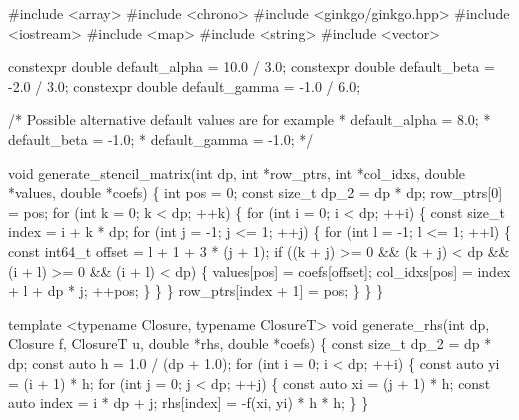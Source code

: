 {\begin{DoxyCodeInclude}
\textcolor{preprocessor}{#include <array>}
\textcolor{preprocessor}{#include <chrono>}
\textcolor{preprocessor}{#include <ginkgo/ginkgo.hpp>}
\textcolor{preprocessor}{#include <iostream>}
\textcolor{preprocessor}{#include <map>}
\textcolor{preprocessor}{#include <string>}
\textcolor{preprocessor}{#include <vector>}

constexpr \textcolor{keywordtype}{double} default\_alpha = 10.0 / 3.0;
constexpr \textcolor{keywordtype}{double} default\_beta = -2.0 / 3.0;
constexpr \textcolor{keywordtype}{double} default\_gamma = -1.0 / 6.0;

\textcolor{comment}{/* Possible alternative default values are for example}
\textcolor{comment}{ * default\_alpha = 8.0;}
\textcolor{comment}{ * default\_beta = -1.0;}
\textcolor{comment}{ * default\_gamma = -1.0;}
\textcolor{comment}{ */}

\textcolor{keywordtype}{void} generate\_stencil\_matrix(\textcolor{keywordtype}{int} dp, \textcolor{keywordtype}{int} *row\_ptrs, \textcolor{keywordtype}{int} *col\_idxs,
                             \textcolor{keywordtype}{double} *values, \textcolor{keywordtype}{double} *coefs)
\{
    \textcolor{keywordtype}{int} pos = 0;
    \textcolor{keyword}{const} \textcolor{keywordtype}{size\_t} dp\_2 = dp * dp;
    row\_ptrs[0] = pos;
    \textcolor{keywordflow}{for} (\textcolor{keywordtype}{int} k = 0; k < dp; ++k) \{
        \textcolor{keywordflow}{for} (\textcolor{keywordtype}{int} i = 0; i < dp; ++i) \{
            \textcolor{keyword}{const} \textcolor{keywordtype}{size\_t} index = i + k * dp;
            \textcolor{keywordflow}{for} (\textcolor{keywordtype}{int} j = -1; j <= 1; ++j) \{
                \textcolor{keywordflow}{for} (\textcolor{keywordtype}{int} l = -1; l <= 1; ++l) \{
                    \textcolor{keyword}{const} int64\_t offset = l + 1 + 3 * (j + 1);
                    \textcolor{keywordflow}{if} ((k + j) >= 0 && (k + j) < dp && (i + l) >= 0 &&
                        (i + l) < dp) \{
                        values[pos] = coefs[offset];
                        col\_idxs[pos] = index + l + dp * j;
                        ++pos;
                    \}
                \}
            \}
            row\_ptrs[index + 1] = pos;
        \}
    \}
\}


\textcolor{keyword}{template} <\textcolor{keyword}{typename} Closure, \textcolor{keyword}{typename} ClosureT>
\textcolor{keywordtype}{void} generate\_rhs(\textcolor{keywordtype}{int} dp, Closure f, ClosureT u, \textcolor{keywordtype}{double} *rhs, \textcolor{keywordtype}{double} *coefs)
\{
    \textcolor{keyword}{const} \textcolor{keywordtype}{size\_t} dp\_2 = dp * dp;
    \textcolor{keyword}{const} \textcolor{keyword}{auto} h = 1.0 / (dp + 1.0);
    \textcolor{keywordflow}{for} (\textcolor{keywordtype}{int} i = 0; i < dp; ++i) \{
        \textcolor{keyword}{const} \textcolor{keyword}{auto} yi = (i + 1) * h;
        \textcolor{keywordflow}{for} (\textcolor{keywordtype}{int} j = 0; j < dp; ++j) \{
            \textcolor{keyword}{const} \textcolor{keyword}{auto} xi = (j + 1) * h;
            \textcolor{keyword}{const} \textcolor{keyword}{auto} index = i * dp + j;
            rhs[index] = -f(xi, yi) * h * h;
        \}
    \}


\end{DoxyCodeInclude}}
